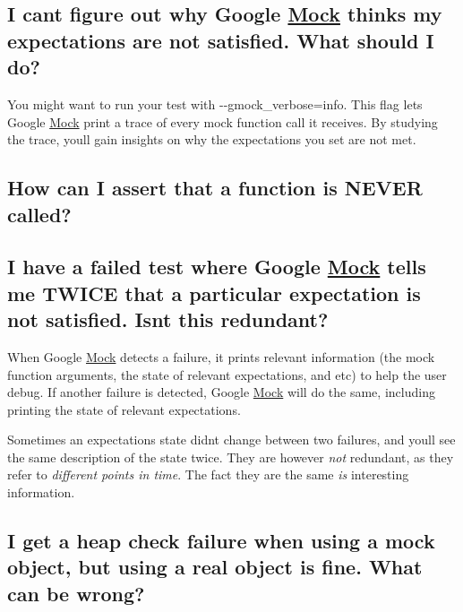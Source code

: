 \subsection*{I can\textquotesingle{}t figure out why Google \mbox{\hyperlink{classMock}{Mock}} thinks my expectations are not satisfied. What should I do?}

You might want to run your test with {\ttfamily -\/-\/gmock\+\_\+verbose=info}. This flag lets Google \mbox{\hyperlink{classMock}{Mock}} print a trace of every mock function call it receives. By studying the trace, you\textquotesingle{}ll gain insights on why the expectations you set are not met.

\subsection*{How can I assert that a function is N\+E\+V\+ER called?}


\begin{DoxyCode}{0}
\end{DoxyCode}


\subsection*{I have a failed test where Google \mbox{\hyperlink{classMock}{Mock}} tells me T\+W\+I\+CE that a particular expectation is not satisfied. Isn\textquotesingle{}t this redundant?}

When Google \mbox{\hyperlink{classMock}{Mock}} detects a failure, it prints relevant information (the mock function arguments, the state of relevant expectations, and etc) to help the user debug. If another failure is detected, Google \mbox{\hyperlink{classMock}{Mock}} will do the same, including printing the state of relevant expectations.

Sometimes an expectation\textquotesingle{}s state didn\textquotesingle{}t change between two failures, and you\textquotesingle{}ll see the same description of the state twice. They are however {\itshape not} redundant, as they refer to {\itshape different points in time}. The fact they are the same {\itshape is} interesting information.

\subsection*{I get a heap check failure when using a mock object, but using a real object is fine. What can be wrong?}

